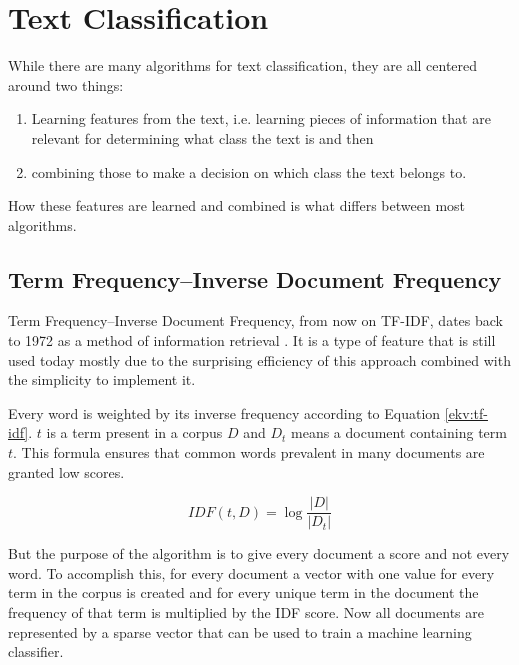 \documentclass[nofilelist]{cslthse-msc}
\begin{document}
\section{Text Classification}

While there are many algorithms for text classification, they are all centered around two things:
\begin{enumerate}
    \item Learning features from the text, i.e. learning pieces of information that are relevant for determining what class the text is and then
    \item combining those to make a decision on which class the text belongs to. 
\end{enumerate}

How these features are learned and combined is what differs between most algorithms.

\subsection{Term Frequency--Inverse Document Frequency}

Term Frequency--Inverse Document Frequency, from now on TF-IDF, dates back to 1972 as a method of information retrieval \cite{jones1972statistical}. It is a type of feature that is still used today mostly due to the surprising efficiency of this approach combined with the simplicity to implement it.


Every word is weighted by its inverse frequency according to Equation \ref{ekv:tf-idf}. $t$ is a term present in a corpus $D$ and $D_t$ means a document containing  term $t$. This formula ensures that common words prevalent in many documents are granted low scores.

\begin{equation}
    IDF(t, D) = \log{\frac{|D|}{|D_t|}}
    \label{ekv:tf-idf}
\end{equation}

But the purpose of the algorithm is to give every document a score and not every word. To accomplish this, for every document a vector with one value for every term in the corpus is created and for every unique term in the document the frequency of that term is multiplied by the IDF score. Now all documents are represented by a sparse vector that can be used to train a machine learning classifier.
\end{document}
